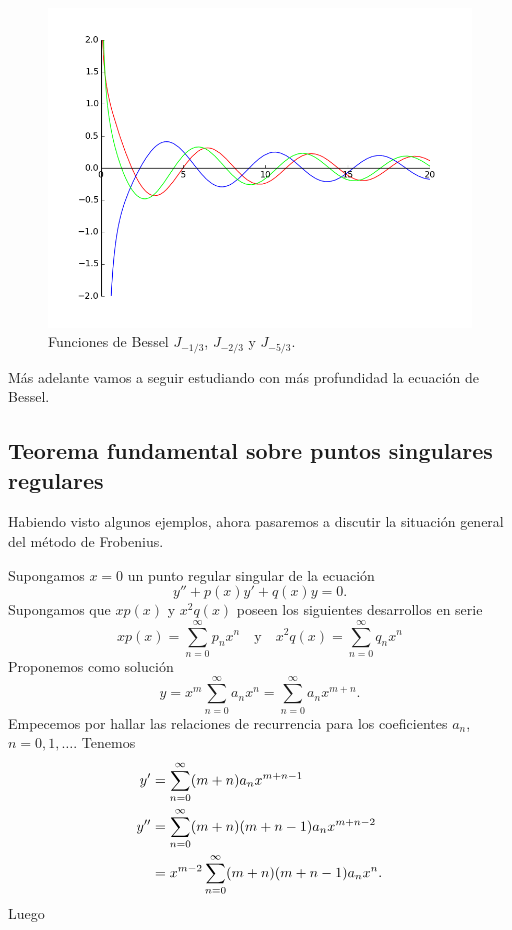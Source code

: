 \documentclass{article}
\newcounter{ejemplo_cont}
\begin{document}
\begin{figure}[h]
\begin{center}
\includegraphics[scale=.5]{imagenes/bessel2.png}
\end{center}
\caption{Funciones de Bessel $J_{-1/3}$, $J_{-2/3}$ y $J_{-5/3}$.} 
\end{figure}
Más adelante vamos a seguir estudiando con más profundidad la ecuación de Bessel.

\subsection{Teorema fundamental sobre puntos singulares regulares}\label{eq:sec_teor_fund_frob}
Habiendo visto algunos ejemplos, ahora pasaremos a discutir la situación general del método de Frobenius. 

Supongamos $x=0$ un punto regular singular de la ecuación
\begin{equation}\label{eq:dif_2_orden} y''+p(x)y'+q(x)y=0.
\end{equation}
Supongamos que $xp(x)$ y $x^2q(x)$ poseen los  siguientes desarrollos en serie 
\[xp(x)=\sum_{n=0}^{\infty}p_nx^n\quad\text{y}\quad x^2q(x)=\sum_{n=0}^{\infty}q_nx^n\]
Proponemos como solución
\[y=x^{m}\sum_{n=0}^{\infty}a_nx^n=\sum_{n=0}^{\infty}a_nx^{m+n}.\]
Empecemos por hallar las relaciones de recurrencia para los coeficientes $a_n$, $n=0,1,\ldots$.   Tenemos
\begin{subequations}
    \begin{align}
      y'&=\sum_{n=0}^{\infty}(m+n)a_{n}x^{m+n-1}\\
      y''&=\sum_{n=0}^{\infty}(m+n)(m+n-1)a_{n}x^{m+n-2}\notag\\
&=x^{m-2}\sum_{n=0}^{\infty}(m+n)(m+n-1)a_{n}x^{n}\label{eq:der_seg} .
    \end{align}
  \end{subequations}
Luego
\end{document}
